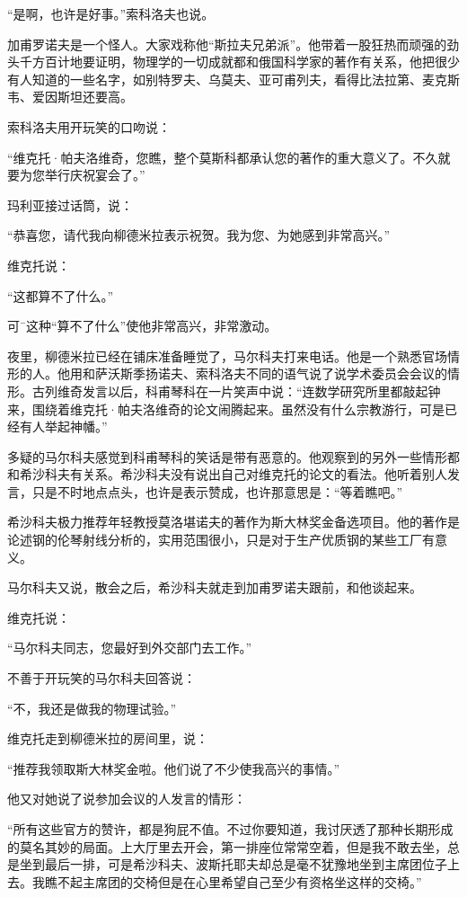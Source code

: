 “是啊，也许是好事。”索科洛夫也说。

加甫罗诺夫是一个怪人。大家戏称他“斯拉夫兄弟派”。他带着一股狂热而顽强的劲头千方百计地要证明，物理学的一切成就都和俄国科学家的著作有关系，他把很少有人知道的一些名字，如别特罗夫、乌莫夫、亚可甫列夫，看得比法拉第、麦克斯韦、爱因斯坦还要高。

索科洛夫用开玩笑的口吻说：

“维克托·帕夫洛维奇，您瞧，整个莫斯科都承认您的著作的重大意义了。不久就要为您举行庆祝宴会了。”

玛利亚接过话筒，说：

“恭喜您，请代我向柳德米拉表示祝贺。我为您、为她感到非常高兴。”

维克托说：

“这都算不了什么。”

可¯这种“算不了什么”使他非常高兴，非常激动。

夜里，柳德米拉已经在铺床准备睡觉了，马尔科夫打来电话。他是一个熟悉官场情形的人。他用和萨沃斯季扬诺夫、索科洛夫不同的语气说了说学术委员会会议的情形。古列维奇发言以后，科甫琴科在一片笑声中说：“连数学研究所里都敲起钟来，围绕着维克托·帕夫洛维奇的论文闹腾起来。虽然没有什么宗教游行，可是已经有人举起神幡。”

多疑的马尔科夫感觉到科甫琴科的笑话是带有恶意的。他观察到的另外一些情形都和希沙科夫有关系。希沙科夫没有说出自己对维克托的论文的看法。他听着别人发言，只是不时地点点头，也许是表示赞成，也许那意思是：“等着瞧吧。”

希沙科夫极力推荐年轻教授莫洛堪诺夫的著作为斯大林奖金备选项目。他的著作是论述钢的伦琴射线分析的，实用范围很小，只是对于生产优质钢的某些工厂有意义。

马尔科夫又说，散会之后，希沙科夫就走到加甫罗诺夫跟前，和他谈起来。

维克托说：

“马尔科夫同志，您最好到外交部门去工作。”

不善于开玩笑的马尔科夫回答说：

“不，我还是做我的物理试验。”

维克托走到柳德米拉的房间里，说：

“推荐我领取斯大林奖金啦。他们说了不少使我高兴的事情。”

他又对她说了说参加会议的人发言的情形：

“所有这些官方的赞许，都是狗屁不值。不过你要知道，我讨厌透了那种长期形成的莫名其妙的局面。上大厅里去开会，第一排座位常常空着，但是我不敢去坐，总是坐到最后一排，可是希沙科夫、波斯托耶夫却总是毫不犹豫地坐到主席团位子上去。我瞧不起主席团的交椅但是在心里希望自己至少有资格坐这样的交椅。”

